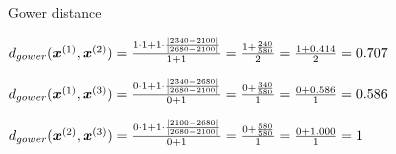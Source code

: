\documentclass[11pt,compress,t,notes=noshow, xcolor=table]{beamer}
\begin{document}
\begin{vbframe}{Gower distance}
\vfill

$d_{gower}(\bm{x}^{(1)},\bm{x}^{(2)}) = \frac{ 1 \cdot 1 + 1 \cdot \frac{\left| 2340 - 2100 \right|}
{\left| 2680 - 2100 \right|}}{1 + 1} = \frac{1 + \frac{240}{580}}{2} = \frac{1 + 0.414}{2} = 0.707
$

\vfill

$d_{gower}(\bm{x}^{(1)},\bm{x}^{(3)}) = \frac{ 0 \cdot 1 + 1 \cdot \frac{\left| 2340 - 2680 \right|}
{\left| 2680 - 2100 \right|}}{0 + 1} = \frac{0 + \frac{340}{580}}{1} = \frac{0 + 0.586}{1} = 0.586
$

\vfill

$d_{gower}(\bm{x}^{(2)},\bm{x}^{(3)}) = \frac{0 \cdot 1 + 1 \cdot \frac{\left| 2100 - 2680 \right|}
{\left| 2680 - 2100 \right|}}{0 + 1} = \frac{0 + \frac{580}{580}}{1} = \frac{0 + 1.000}{1} = 1
$

\vfill
\end{vbframe}





\endlecture
\end{document}
